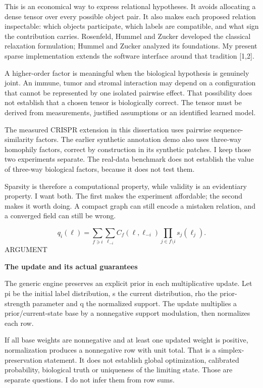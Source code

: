\documentclass[10pt]{article}
\begin{document}
This is an economical way to express relational hypotheses. It avoids allocating a dense tensor over every possible object pair. It also makes each proposed relation inspectable: which objects participate, which labels are compatible, and what sign the contribution carries. Rosenfeld, Hummel and Zucker developed the classical relaxation formulation; Hummel and Zucker analyzed its foundations. My present sparse implementation extends the software interface around that tradition [1,2].\par
A higher-order factor is meaningful when the biological hypothesis is genuinely joint. An immune, tumor and stromal interaction may depend on a configuration that cannot be represented by one isolated pairwise effect. That possibility does not establish that a chosen tensor is biologically correct. The tensor must be derived from measurements, justified assumptions or an identified learned model.\par
The measured CRISPR extension in this dissertation uses pairwise sequence-similarity factors. The earlier synthetic annotation demo also uses three-way homophily factors, correct by construction in its synthetic patches. I keep those two experiments separate. The real-data benchmark does not establish the value of three-way biological factors, because it does not test them.\par
Sparsity is therefore a computational property, while validity is an evidentiary property. I want both. The first makes the experiment affordable; the second makes it worth doing. A compact graph can still encode a mistaken relation, and a converged field can still be wrong.\par
\[q_i(\ell)=\sum_{f\ni i}\sum_{\ell_{-i}} C_f(\ell,\ell_{-i})\prod_{j\in f\setminus i}s_j(\ell_j).\]
\clearpage
\hypertarget{p9}{}
{\small\color{accent}\MakeUppercase{Argument}}\par
{\LARGE\bfseries\color{ink}The update and its actual guarantees}\par\vspace{5pt}
The generic engine preserves an explicit prior in each multiplicative update. Let pi be the initial label distribution, s the current distribution, rho the prior-strength parameter and q the normalized support. The update multiplies a prior/current-state base by a nonnegative support modulation, then normalizes each row.\par
If all base weights are nonnegative and at least one updated weight is positive, normalization produces a nonnegative row with unit total. That is a simplex-preservation statement. It does not establish global optimization, calibrated probability, biological truth or uniqueness of the limiting state. Those are separate questions. I do not infer them from row sums.\par
\end{document}

